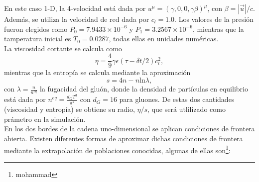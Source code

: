 \documentclass{article}
\begin{document}
En este caso 1-D, la 4-velocidad está dada por $u^{\mu}= (\gamma, 0, 0, \gamma \beta)^{\mu}$, con $\beta = |\vec{u}|/c$. Además, se utiliza la velocidad de red dada por $c_l=1.0$. Los valores de la presión fueron elegidos como $P_0= 7.9433\times 10^{-6}$ y $P_1= 3.2567\times 10^{-6}$, mientras que la tamperatura inicial es $T_0= 0.0287$, todas ellas en unidades numéricas.\\

 La viscosidad cortante se calcula como 
 \begin{equation}
\eta = \frac{4}{9} \gamma \epsilon (\tau-\delta t /2) c_l^2,
 \end{equation}
 mientras que la entropía se calcula mediante la aproximación 
 \begin{equation}
     s= 4n - n\text{ln} \lambda,
 \end{equation}
 con $\lambda = \frac{n}{n^{eq}}$ la fugacidad del gluón, donde la densidad de partículas en equilibrio está dada por $n^{eq}= \frac{d_G T^3}{\pi^2}$ con $d_G=16$ para gluones. De estas dos cantidades (viscosidad y entropía) se obtiene su radio, $\eta/s$, que será utlilizado como prámetro en la simulación.\\
 
 En los dos bordes de la cadena uno-dimensional se aplican condiciones de frontera abierta. Existen diferentes formas de aproximar dichas condiciones de frontera mediante la extrapolación de poblaciones conocidas, algunas de ellas son\footnote{mohammad}:
 
\end{document}
